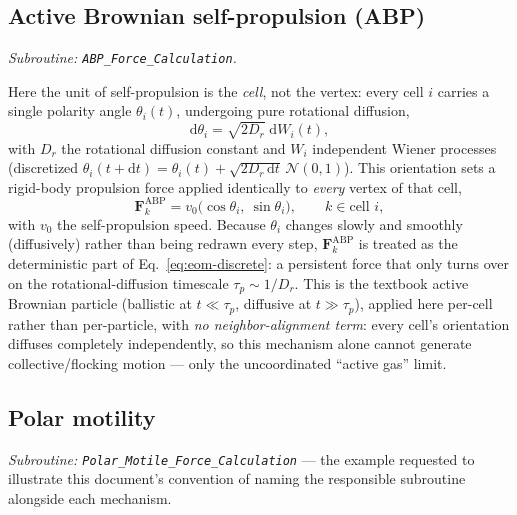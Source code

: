 \documentclass[11pt]{article}
\newcommand{\ord}{\mathrm{d}}
\begin{document}
\subsection{Active Brownian self-propulsion (ABP)}
\label{sec:abp}
\textit{Subroutine: \texttt{ABP\_\allowbreak Force\_\allowbreak Calculation}.}

Here the unit of self-propulsion is the \emph{cell}, not the vertex: every cell $i$
carries a single polarity angle $\theta_i(t)$, undergoing pure rotational diffusion,
\begin{equation}
  \ord \theta_i = \sqrt{2 D_r}\; \ord W_i(t),
  \label{eq:theta-diffusion}
\end{equation}
with $D_r$ the rotational diffusion constant and $W_i$ independent Wiener processes
(discretized $\theta_i(t{+}\ord t) = \theta_i(t) + \sqrt{2D_r\,\ord t}\,\mathcal N(0,1)$).
This orientation sets a rigid-body propulsion force applied identically to \emph{every}
vertex of that cell,
\begin{equation}
  \mathbf{F}_k^{\text{ABP}} = v_0\big(\cos\theta_i,\ \sin\theta_i\big), \qquad k \in \text{cell } i,
  \label{eq:abp-force}
\end{equation}
with $v_0$ the self-propulsion speed. Because $\theta_i$ changes slowly and smoothly
(diffusively) rather than being redrawn every step, $\mathbf{F}_k^{\text{ABP}}$ is
treated as the deterministic part of Eq.~\eqref{eq:eom-discrete}: a persistent force
that only turns over on the rotational-diffusion timescale $\tau_p\sim 1/D_r$. This is
the textbook active Brownian particle (ballistic at $t\ll\tau_p$, diffusive at
$t\gg\tau_p$), applied here per-cell rather than per-particle, with \emph{no
neighbor-alignment term}: every cell's orientation diffuses completely independently,
so this mechanism alone cannot generate collective/flocking motion --- only the
uncoordinated ``active gas'' limit.

\subsection{Polar motility}
\label{sec:polar}
\textit{Subroutine: \texttt{Polar\_\allowbreak Motile\_\allowbreak Force\_\allowbreak Calculation}} --- the example
requested to illustrate this document's convention of naming the responsible
subroutine alongside each mechanism.
\end{document}
